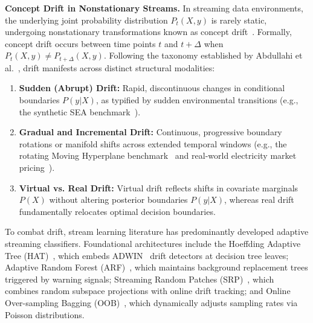 \documentclass[preprint,10pt]{elsarticle}
\begin{document}
\textbf{Concept Drift in Nonstationary Streams.} \quad In streaming data environments, the underlying joint probability distribution $P_t(X, y)$ is rarely static, undergoing nonstationary transformations known as concept drift~\cite{aguiar2023,abdullahi2025}. Formally, concept drift occurs between time points $t$ and $t + \Delta$ when $P_t(X, y) \neq P_{t+\Delta}(X, y)$. Following the taxonomy established by Abdullahi et al.~\cite{abdullahi2025}, drift manifests across distinct structural modalities:
\begin{enumerate}[leftmargin=1.5em,label=(\alph*)]
\item \textbf{Sudden (Abrupt) Drift:} Rapid, discontinuous changes in conditional boundaries $P(y|X)$, as typified by sudden environmental transitions (e.g., the synthetic SEA benchmark~\cite{qiao2022}).
\item \textbf{Gradual and Incremental Drift:} Continuous, progressive boundary rotations or manifold shifts across extended temporal windows (e.g., the rotating Moving Hyperplane benchmark~\cite{wang2024quad} and real-world electricity market pricing~\cite{heidrich2022}).
\item \textbf{Virtual vs. Real Drift:} Virtual drift reflects shifts in covariate marginals $P(X)$ without altering posterior boundaries $P(y|X)$, whereas real drift fundamentally relocates optimal decision boundaries.
\end{enumerate}

To combat drift, stream learning literature has predominantly developed adaptive streaming classifiers. Foundational architectures include the Hoeffding Adaptive Tree (HAT)~\cite{bifet2009}, which embeds ADWIN~\cite{bifet2007} drift detectors at decision tree leaves; Adaptive Random Forest (ARF)~\cite{gomes2017}, which maintains background replacement trees triggered by warning signals; Streaming Random Patches (SRP)~\cite{gomes2019}, which combines random subspace projections with online drift tracking; and Online Over-sampling Bagging (OOB)~\cite{wang2015}, which dynamically adjusts sampling rates via Poisson distributions.
\end{document}
